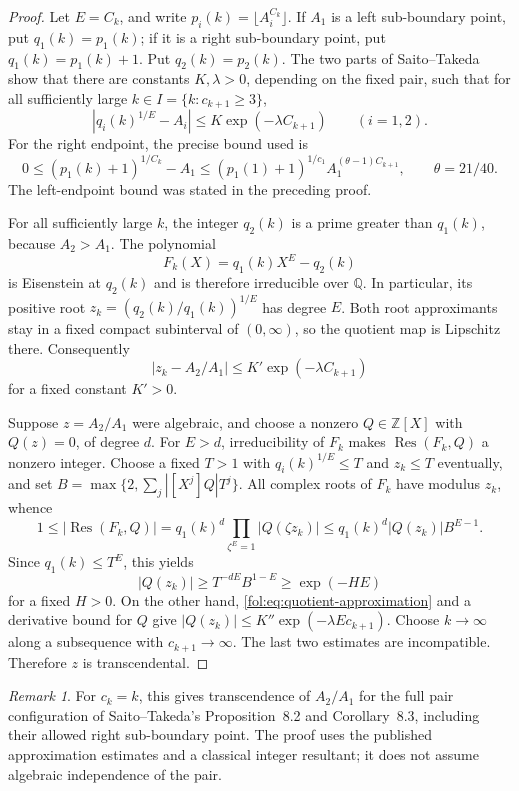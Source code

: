 \documentclass[11pt,a4paper]{article}
\theoremstyle{definition}
\theoremstyle{remark}
\newtheorem{remark}[theorem]{Remark}
\numberwithin{equation}{section}
\begin{document}
\begin{proof}
Let $E=C_k$, and write $p_i(k)=\lfloor A_i^{C_k}\rfloor$.
If $A_1$ is a left sub-boundary point, put $q_1(k)=p_1(k)$; if it is a
right sub-boundary point, put $q_1(k)=p_1(k)+1$. Put $q_2(k)=p_2(k)$.
The two parts of Saito--Takeda~\cite[Lemma~5.2]{SaitoTakeda2022} show
that there are constants $K,\lambda>0$, depending on the fixed pair,
such that for all sufficiently large $k\in I=\{k:c_{k+1}\ge3\}$,
\[
 |q_i(k)^{1/E}-A_i|\le K\exp(-\lambda C_{k+1})\qquad(i=1,2).
\]
For the right endpoint, the precise bound used is
\[
 0\le(p_1(k)+1)^{1/C_k}-A_1
 \le(p_1(1)+1)^{1/c_1}A_1^{(\theta-1)C_{k+1}},
 \qquad\theta=21/40.
\]
The left-endpoint bound was stated in the preceding proof.

For all sufficiently large $k$, the integer $q_2(k)$ is a prime greater
than $q_1(k)$, because $A_2>A_1$. The polynomial
\[
 F_k(X)=q_1(k)X^E-q_2(k)
\]
is Eisenstein at $q_2(k)$ and is therefore irreducible over $\mathbb Q$.
In particular, its positive root
$z_k=(q_2(k)/q_1(k))^{1/E}$ has degree $E$.
Both root approximants stay in a fixed compact subinterval of
$(0,\infty)$, so the quotient map is Lipschitz there. Consequently
\begin{equation}\label{fol:eq:quotient-approximation}
 |z_k-A_2/A_1|\le K'\exp(-\lambda C_{k+1})
\end{equation}
for a fixed constant $K'>0$.

Suppose $z=A_2/A_1$ were algebraic, and choose a nonzero
$Q\in\mathbb Z[X]$ with $Q(z)=0$, of degree $d$. For $E>d$,
irreducibility of $F_k$ makes $\operatorname{Res}(F_k,Q)$ a nonzero
integer. Choose a fixed $T>1$ with $q_i(k)^{1/E}\le T$ and $z_k\le T$
eventually, and set $B=\max\{2,\sum_j|[X^j]Q|T^j\}$.
All complex roots of $F_k$ have modulus $z_k$, whence
\[
 1\le|\operatorname{Res}(F_k,Q)|
 =q_1(k)^d\prod_{\zeta^E=1}|Q(\zeta z_k)|
 \le q_1(k)^d|Q(z_k)|B^{E-1}.
\]
Since $q_1(k)\le T^E$, this yields
\[
 |Q(z_k)|\ge T^{-dE}B^{1-E}\ge\exp(-H E)
\]
for a fixed $H>0$. On the other hand,
\eqref{fol:eq:quotient-approximation} and a derivative bound for $Q$ give
$|Q(z_k)|\le K''\exp(-\lambda E c_{k+1})$.
Choose $k\to\infty$ along a subsequence with $c_{k+1}\to\infty$.
The last two estimates are incompatible. Therefore $z$ is
transcendental.
\end{proof}

\begin{remark}
For $c_k=k$, this gives transcendence of $A_2/A_1$ for the full pair
configuration of Saito--Takeda's Proposition~8.2 and Corollary~8.3,
including their allowed right sub-boundary point. The proof uses the
published approximation estimates and a classical integer resultant;
it does not assume algebraic independence of the pair.
\end{remark}
\end{document}
